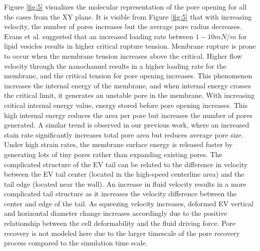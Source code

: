 Figure \ref{fig:5} visualizes the molecular representation of the pore opening for all the cases from the XY plane. It is visible from Figure \ref{fig:5} that with increasing velocity, the number of pores increases but the average pore radius decreases. Evans et al.\cite{a68} suggested that an increased loading rate between $1-10 mN/m$ for lipid vesicles results in higher critical rupture tension. Membrane rupture is prone to occur when the membrane tension increases above the critical. Higher flow velocity through the nanochannel results in a higher loading rate for the membrane, and the critical tension for pore opening increases. This phenomenon increases the internal energy of the membrane, and when internal energy crosses the critical limit, it generates an unstable pore in the membrane. With increasing critical internal energy value, energy stored before pore opening increases. This high internal energy reduces the area per pore but increases the number of pores generated. A similar trend is observed in our previous work\cite{a69}, where an increased stain rate significantly increases total pore area but reduces average pore size. Under high strain rates, the membrane surface energy is released faster by generating lots of tiny pores rather than expanding existing pores. The complicated structure of the EV tail can be related to the difference in velocity between the EV tail center (located in the high-speed centerline area) and the tail edge (located near the wall). An increase in fluid velocity results in a more complicated tail structure as it increases the velocity difference between the center and edge of the tail. As squeezing velocity increases, deformed EV vertical and horizontal diameter change increases accordingly due to the positive relationship between the cell deformability and the fluid driving force. Pore recovery is not modeled here due to the larger timescale of the pore recovery process compared to the simulation time scale.

